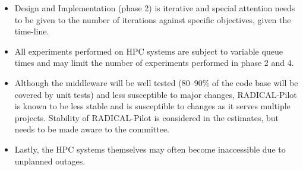 \begin{itemize}
	\item Design and Implementation (phase 2) is iterative and special attention needs to be given to the number of iterations against specific objectives, given the time-line.
    \item All experiments performed on HPC systems are subject to variable queue times and may limit the number of experiments performed in phase 2 and 4.
	\item Although the middleware will be well tested (80--90\% of the code base will be covered by unit tests) and less susceptible to major changes, RADICAL-Pilot is known to be less stable and is susceptible to changes as it serves multiple projects. Stability of RADICAL-Pilot is considered in the estimates, but needs to be made aware to the committee.
	\item Lastly, the HPC systems themselves may often become inaccessible due to unplanned outages.
\end{itemize}



